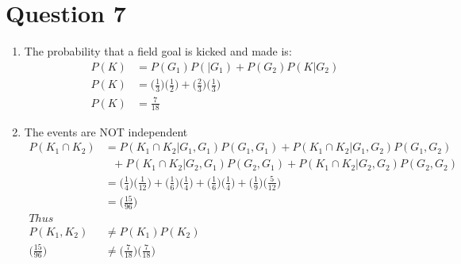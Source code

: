 \documentclass[12pt, letterpaper, fleqn]{article}
\begin{document}
\section*{Question 7}
	\begin{enumerate}
		\item The probability that a field goal is kicked and made is:
			\begin{align*}
				P(K) &= P(G_1)P(|G_1) + P(G_2)P(K|G_2) \\
				P(K) &= \Big( \frac{1}{3} \Big) \Big( \frac{1}{2} \Big) + \Big( \frac{2}{3} \Big) \Big( \frac{1}{3} \Big) \\
				P(K) &= \frac{7}{18}
			\end{align*}
		\item The events are NOT independent
			\begin{align*}
				P(K_1 \cap K_2) &= P(K_1 \cap K_2 | G_1, G_1)P(G_1, G_1)+P(K_1 \cap K_2 | G_1, G_2)P(G_1, G_2)\\
				& \ \ \ + P(K_1 \cap K_2 | G_2, G_1)P(G_2, G_1) + P(K_1 \cap K_2 | G_2, G_2)P(G_2, G_2 ) \\
				&= \Big( \frac{1}{4} \Big) \Big( \frac{1}{12} \Big) + \Big( \frac{1}{6} \Big) \Big( \frac{1}{4} \Big) + \Big( \frac{1}{6} \Big) \Big( \frac{1}{4} \Big) + \Big( \frac{1}{9} \Big) \Big( \frac{5}{12} \Big) \\
				&= \Big( \frac{15}{96} \Big) \\
				Thus &\\
				P(K_1, K_2) &\neq P(K_1)P(K_2) \\
				\Big( \frac{15}{96} \Big) &\neq \Big( \frac{7}{18} \Big) \Big( \frac{7}{18} \Big)
			\end{align*}
	\end{enumerate}
\end{document}
